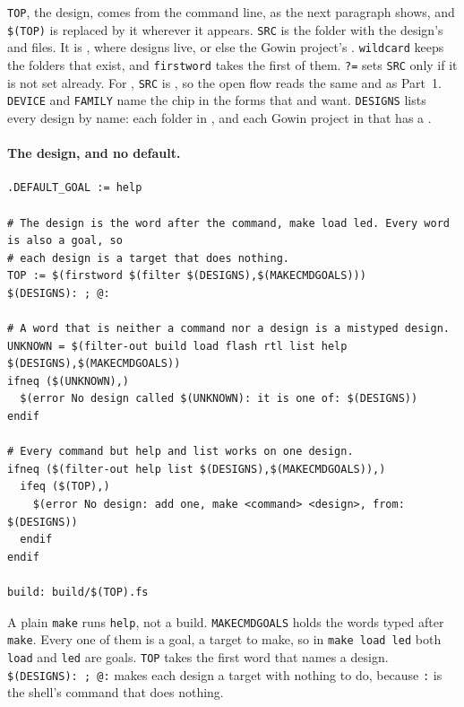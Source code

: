 \documentclass[11pt,a4paper]{article}
\begin{document}
\texttt{TOP}, the design, comes from the command line, as the next paragraph shows, and \texttt{\$(TOP)} is replaced by it wherever it appears. \texttt{SRC} is the folder with the design’s  and  files. It is , where designs live, or else the Gowin project’s . \texttt{wildcard} keeps the folders that exist, and \texttt{firstword} takes the first of them. \texttt{?=} sets \texttt{SRC} only if it is not set already. For , \texttt{SRC} is , so the open flow reads the same  and  as Part~1. \texttt{DEVICE} and \texttt{FAMILY} name the chip in the forms that  and  want. \texttt{DESIGNS} lists every design by name: each folder in , and each Gowin project in  that has a .

\paragraph{The design, and no default.}

\begin{verbatim}
.DEFAULT_GOAL := help

# The design is the word after the command, make load led. Every word is also a goal, so
# each design is a target that does nothing.
TOP := $(firstword $(filter $(DESIGNS),$(MAKECMDGOALS)))
$(DESIGNS): ; @:

# A word that is neither a command nor a design is a mistyped design.
UNKNOWN = $(filter-out build load flash rtl list help $(DESIGNS),$(MAKECMDGOALS))
ifneq ($(UNKNOWN),)
  $(error No design called $(UNKNOWN): it is one of: $(DESIGNS))
endif

# Every command but help and list works on one design.
ifneq ($(filter-out help list $(DESIGNS),$(MAKECMDGOALS)),)
  ifeq ($(TOP),)
    $(error No design: add one, make <command> <design>, from: $(DESIGNS))
  endif
endif

build: build/$(TOP).fs
\end{verbatim}

A plain \texttt{make} runs \texttt{help}, not a build. \texttt{MAKECMDGOALS} holds the words typed after \texttt{make}. Every one of them is a goal, a target to make, so in \texttt{make load led} both \texttt{load} and \texttt{led} are goals. \texttt{TOP} takes the first word that names a design. \texttt{\$(DESIGNS): ; @:} makes each design a target with nothing to do, because \texttt{:} is the shell’s command that does nothing.
\end{document}
